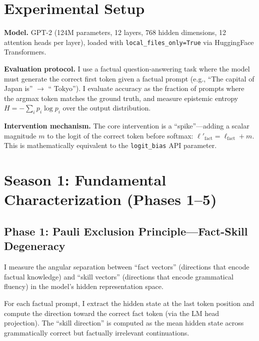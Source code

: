 \documentclass[11pt,a4paper]{article}
\begin{document}
\section{Experimental Setup}

\textbf{Model.} GPT-2 (124M parameters, 12 layers, 768 hidden dimensions, 12 attention heads per layer), loaded with \texttt{local\_files\_only=True} via HuggingFace Transformers.

\textbf{Evaluation protocol.} I use a factual question-answering task where the model must generate the correct first token given a factual prompt (e.g., ``The capital of Japan is'' $\to$ `` Tokyo''). I evaluate accuracy as the fraction of prompts where the argmax token matches the ground truth, and measure epistemic entropy $H = -\sum_i p_i \log p_i$ over the output distribution.

\textbf{Intervention mechanism.} The core intervention is a ``spike''---adding a scalar magnitude $m$ to the logit of the correct token before softmax: $\ell'_{\text{fact}} = \ell_{\text{fact}} + m$. This is mathematically equivalent to the \texttt{logit\_bias} API parameter.

\section{Season 1: Fundamental Characterization (Phases 1--5)}

\subsection{Phase 1: Pauli Exclusion Principle---Fact-Skill Degeneracy}

I measure the angular separation between ``fact vectors'' (directions that encode factual knowledge) and ``skill vectors'' (directions that encode grammatical fluency) in the model's hidden representation space.

For each factual prompt, I extract the hidden state at the last token position and compute the direction toward the correct fact token (via the LM head projection). The ``skill direction'' is computed as the mean hidden state across grammatically correct but factually irrelevant continuations.
\end{document}
